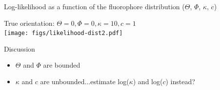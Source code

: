 \documentclass[presentation]{beamer}
\begin{document}
\begin{frame}[label=sec-4]{Log-likelihood as a function of the fluorophore distribution ($\Theta$, $\Phi$, $\kappa$, $c$)}
\begin{center}
True orientation: $\Theta = 0, \Phi = 0, \kappa = 10, c = 1$\\
  \texttt{[image: figs/likelihood-dist2.pdf]}\\
\end{center}
\end{frame}
\begin{frame}[label=sec-5]{Discussion}
\begin{itemize}
\item $\Theta$ and $\Phi$ are bounded
\item $\kappa$ and $c$ are unbounded...estimate log($\kappa$) and log($c$) instead?
\end{itemize}
\end{frame}
\end{document}
